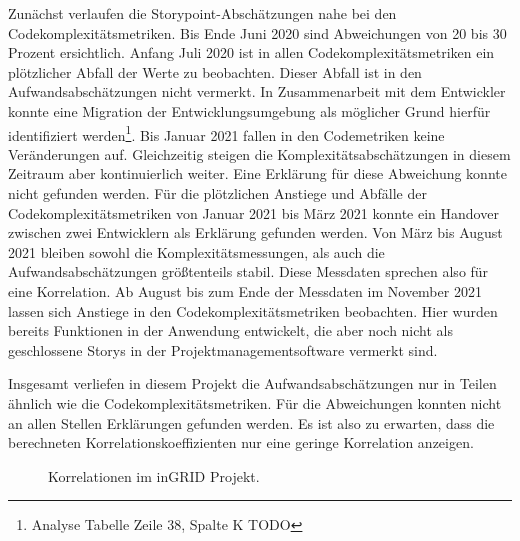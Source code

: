 Zunächst verlaufen die Storypoint-Abschätzungen nahe bei den
Codekomplexitätsmetriken. Bis Ende Juni 2020 sind Abweichungen von 20
bis 30 Prozent ersichtlich. Anfang Juli 2020 ist in allen
Codekomplexitätsmetriken ein plötzlicher Abfall der Werte zu beobachten.
Dieser Abfall ist in den Aufwandsabschätzungen nicht vermerkt. In
Zusammenarbeit mit dem Entwickler konnte eine Migration der
Entwicklungsumgebung als möglicher Grund hierfür identifiziert
werden\footnote{Analyse Tabelle Zeile 38, Spalte K TODO}. Bis Januar 2021
fallen in den Codemetriken keine Veränderungen auf. Gleichzeitig steigen
die Komplexitätsabschätzungen in diesem Zeitraum aber kontinuierlich
weiter. Eine Erklärung für diese Abweichung konnte nicht gefunden
werden. Für die plötzlichen Anstiege und Abfälle der
Codekomplexitätsmetriken von Januar 2021 bis März 2021 konnte ein
Handover zwischen zwei Entwicklern als Erklärung gefunden werden. Von
März bis August 2021 bleiben sowohl die Komplexitätsmessungen, als auch
die Aufwandsabschätzungen grö\ss tenteils stabil. Diese Messdaten sprechen
also für eine Korrelation. Ab August bis zum Ende der Messdaten im
November 2021 lassen sich Anstiege in den Codekomplexitätsmetriken
beobachten. Hier wurden bereits Funktionen in der Anwendung entwickelt,
die aber noch nicht als geschlossene Storys in der
Projektmanagementsoftware vermerkt sind.

Insgesamt verliefen in diesem Projekt die Aufwandsabschätzungen nur in
Teilen ähnlich wie die Codekomplexitätsmetriken. Für die Abweichungen
konnten nicht an allen Stellen Erklärungen gefunden werden. Es ist also
zu erwarten, dass die berechneten Korrelationskoeffizienten nur eine
geringe Korrelation anzeigen.

\begin{figure}\label{ingrid-correlation-graph}
  \begin{center}
      
  \end{center}
  \caption{Korrelationen im inGRID Projekt.}
\end{figure} 

